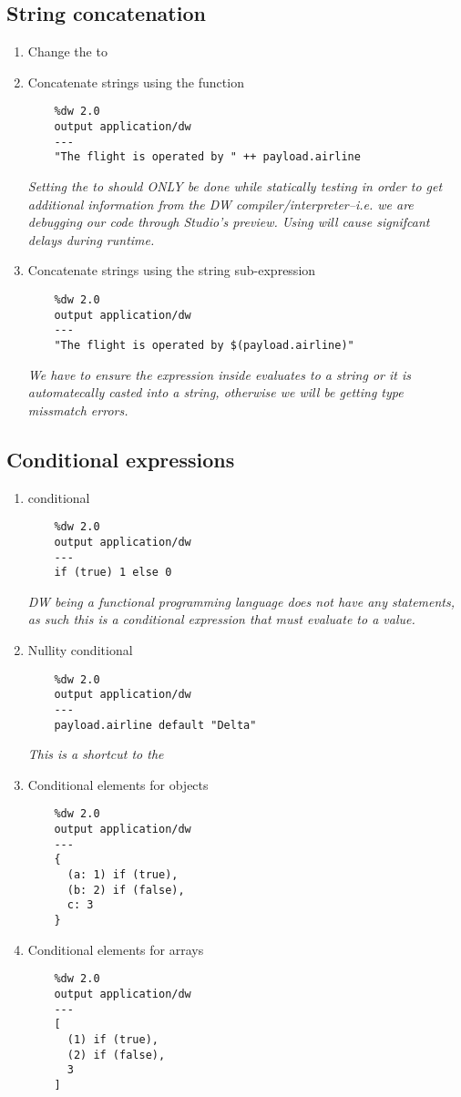\subsection{String concatenation}
\begin{enumerate}[resume*]
\item Change the  to 
\item Concatenate strings using the \ttt{++} function
  \begin{verbatim}
    %dw 2.0
    output application/dw
    ---
    "The flight is operated by " ++ payload.airline
  \end{verbatim}
  \emph{
    Setting the  to  should ONLY be done while statically testing in order to get additional information from the DW compiler/interpreter--i.e. we are debugging our code through Studio's preview.  Using  will cause signifcant delays during runtime.
  }
\item Concatenate strings using the \ttt{\$()} string sub-expression
  \begin{verbatim}
    %dw 2.0
    output application/dw
    ---
    "The flight is operated by $(payload.airline)"
  \end{verbatim}
  \emph{
    We have to ensure the expression inside \ttt{\$()} evaluates to a string or it is automatecally casted into a string, otherwise we will be getting type missmatch errors.
  }
\end{enumerate}

\subsection{Conditional expressions}
\begin{enumerate}[resume*]
\item {} conditional
  \begin{verbatim}
    %dw 2.0
    output application/dw
    ---
    if (true) 1 else 0
  \end{verbatim}
  \emph{
    DW being a functional programming language does not have any statements, as such this is a conditional expression that must evaluate to a value.
  }
\item Nullity conditional
  \begin{verbatim}
    %dw 2.0
    output application/dw
    ---
    payload.airline default "Delta"
  \end{verbatim}
  \emph{
    This is a shortcut to the 
  }
\item Conditional elements for objects
  \begin{verbatim}
    %dw 2.0
    output application/dw
    ---
    {
      (a: 1) if (true),
      (b: 2) if (false),
      c: 3
    }
  \end{verbatim}
\item Conditional elements for arrays
  \begin{verbatim}
    %dw 2.0
    output application/dw
    ---
    [
      (1) if (true),
      (2) if (false),
      3
    ]
  \end{verbatim}
\end{enumerate}
